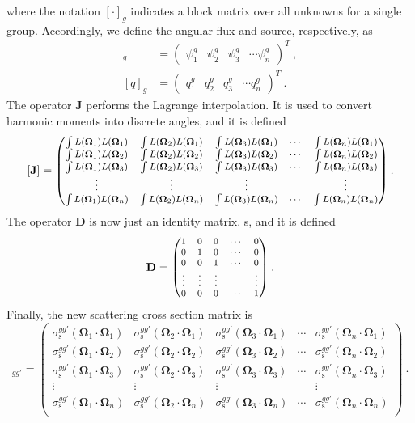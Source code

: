 \documentclass[12pt,twoside]{article}
\newcommand{\ve}[1]{\ensuremath{\mathbf{#1}}}
\newcommand{\vOmega}{\ensuremath{\ve{\Omega}}}
\newcommand{\Jij}[2]{\ensuremath{\int L(\vOmega_#1)L(\vOmega_#2)}}
\newcommand{\Sij}[2]{\ensuremath{\sigma^{gg'}_{\text{s}}(\vOmega_#1 \cdot \vOmega_#2)}}
\begin{document}
where the notation $[\cdot]_g$ indicates a block matrix over all
unknowns for a single group.  Accordingly, we define the angular flux and source, respectively, as
\begin{align}
  [\psi]_g &= \begin{pmatrix}
    \psi^g_1 & \psi^g_2 & \psi^g_3 & \cdots \psi^g_n
  \end{pmatrix}^T\:, \\
    [q]_g &= \begin{pmatrix}
    q^g_1 & q^g_2 & q^g_3 & \cdots q^g_n
  \end{pmatrix}^T\:.
\end{align}
%
The operator $\ve{J}$ performs the Lagrange interpolation. It is used
to convert harmonic moments into discrete angles, and it is defined
\begin{equation}
  {\footnotesize
  [\ve{J}] = \begin{pmatrix}
    \Jij{1}{1} & \Jij{2}{1} & \Jij{3}{1} & \cdots & \Jij{n}{1} \\
    \Jij{1}{2} & \Jij{2}{2} & \Jij{3}{2} & \cdots & \Jij{n}{2} \\
    \Jij{1}{3} & \Jij{2}{3} & \Jij{3}{3} & \cdots & \Jij{n}{3} \\
    \vdots     & \vdots     & \vdots     &        & \vdots     \\    
    \Jij{1}{n} & \Jij{2}{n} & \Jij{3}{n} & \cdots & \Jij{n}{n} \\
  \end{pmatrix}}\:.
\end{equation}
%
The operator $\ve{D}$ is now just an identity matrix. s, and it is defined
\begin{equation}
  {\footnotesize
  \ve{D} = \begin{pmatrix}
    1 & 0 & 0 & \cdots & 0 \\
    0 & 1 & 0 & \cdots & 0 \\
    0 & 0 & 1 & \cdots & 0 \\
    \vdots & \vdots & \vdots & & \vdots \\
    0 & 0 & 0 & \cdots & 1    
  \end{pmatrix}}\:.
\end{equation}
%
Finally, the new scattering cross section matrix is
\begin{equation}
  [\ve{S}]_{gg'} = \begin{pmatrix}
    \Sij{1}{1} & \Sij{2}{1} & \Sij{3}{1} & \cdots & \Sij{n}{1} \\
    \Sij{1}{2} & \Sij{2}{2} & \Sij{3}{2} & \cdots & \Sij{n}{2} \\
    \Sij{1}{3} & \Sij{2}{3} & \Sij{3}{3} & \cdots & \Sij{n}{3} \\
    \vdots     & \vdots     & \vdots     &        & \vdots     \\    
    \Sij{1}{n} & \Sij{2}{n} & \Sij{3}{n} & \cdots & \Sij{n}{n} \\
  \end{pmatrix}\:.
\end{equation}
\end{document}
